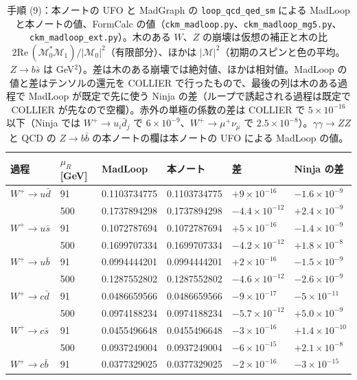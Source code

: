 \documentclass[a4paper,10pt]{ltjsarticle}
\newcommand{\re}{\mathrm{Re}\,}
\begin{document}
\begin{table}[tbp]
\centering\footnotesize\setlength{\tabcolsep}{4pt}
\caption{手順 (9)：本ノートの UFO と MadGraph の \texttt{loop\_qcd\_qed\_sm} による MadLoop と本ノートの値、FormCalc の値（\texttt{ckm\_madloop.py}、\texttt{ckm\_madloop\_mg5.py}、\texttt{ckm\_madloop\_ext.py}）。木のある $W$、$Z$ の崩壊は仮想の補正と木の比 $2\re(\mathcal M_0^*\mathcal M_1)/|\mathcal M_0|^2$（有限部分）、ほかは $|\mathcal M|^2$（初期のスピンと色の平均。$Z\to b\bar s$ は GeV$^2$）。差は木のある崩壊では絶対値、ほかは相対値。MadLoop の値と差はテンソルの還元を COLLIER で行ったもので、最後の列は木のある過程で MadLoop が既定で先に使う Ninja の差（ループで誘起される過程は既定で COLLIER が先なので空欄）。赤外の単極の係数の差は COLLIER で $5\times10^{-16}$ 以下（Ninja では $W^+\to u_i\bar d_j$ で $6\times10^{-9}$、$W^+\to\mu^+\nu_\mu$ で $2.5\times10^{-8}$）。$\gamma\gamma\to ZZ$ と QCD の $Z\to b\bar b$ の本ノートの欄は本ノートの UFO による MadLoop の値。}
\label{tab:mlckm}
\begin{tabular}{llllll}
\toprule
過程 & $\mu_R$ [GeV] & MadLoop & 本ノート & 差 & Ninja の差 \\
\midrule
$W^+\to u\bar d$ & 91 & 0.1103734775 & 0.1103734775 & $+9\times10^{-16}$ & $-1.6\times10^{-9}$ \\
 & 500 & 0.1737894298 & 0.1737894298 & $-4.4\times10^{-12}$ & $+2.4\times10^{-9}$ \\
$W^+\to u\bar s$ & 91 & 0.1072787694 & 0.1072787694 & $+5\times10^{-16}$ & $-1.4\times10^{-9}$ \\
 & 500 & 0.1699707334 & 0.1699707334 & $-4.2\times10^{-12}$ & $+1.8\times10^{-8}$ \\
$W^+\to u\bar b$ & 91 & 0.0994444201 & 0.0994444201 & $+2\times10^{-16}$ & $-1.5\times10^{-9}$ \\
 & 500 & 0.1287552802 & 0.1287552802 & $-4.6\times10^{-12}$ & $-2.6\times10^{-9}$ \\
$W^+\to c\bar d$ & 91 & 0.0486659566 & 0.0486659566 & $-9\times10^{-17}$ & $-5\times10^{-11}$ \\
 & 500 & 0.0974188234 & 0.0974188234 & $-5.7\times10^{-12}$ & $+5.0\times10^{-9}$ \\
$W^+\to c\bar s$ & 91 & 0.0455496648 & 0.0455496648 & $-3\times10^{-16}$ & $+1.4\times10^{-10}$ \\
 & 500 & 0.0937249004 & 0.0937249004 & $-6\times10^{-15}$ & $+2.1\times10^{-8}$ \\
$W^+\to c\bar b$ & 91 & 0.0377329025 & 0.0377329025 & $-2\times10^{-16}$ & $-3\times10^{-15}$ \\

\end{tabular}
\end{table}
\end{document}
